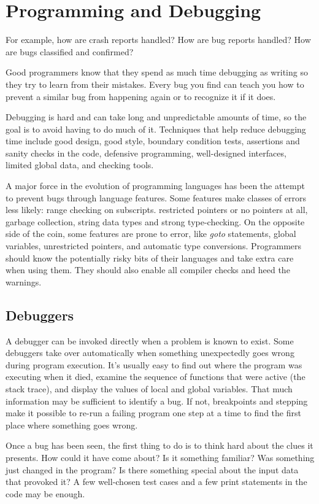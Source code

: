 \documentclass[draftclsnofoot,journal,onecolumn,12pt]{IEEEtran}
\begin{document}
\section{Programming and Debugging}

For example, how are crash reports handled? How are bug reports handled? How are bugs classified and confirmed?

Good programmers know that they spend as much time debugging as writing so they try to learn from their mistakes. Every bug you find can teach you how to prevent a similar bug from happening again or to recognize it if it does.

Debugging is hard and can take long and unpredictable amounts of time, so the goal is to avoid having to do much of it. Techniques that help reduce debugging time include good design, good style, boundary condition tests, assertions and sanity checks in the code, defensive programming, well-designed interfaces, limited global data, and checking tools.

A major force in the evolution of programming languages has been the attempt to prevent bugs through language features. Some features make classes of errors less likely: range checking on subscripts. restricted pointers or no pointers at all, garbage collection, string data types and strong type-checking. On the opposite side of the coin, some features are prone to error, like \textit{goto} statements, global variables, unrestricted pointers, and automatic type conversions. Programmers should know the potentially risky bits of their languages and take extra care when using them. They should also enable all compiler checks and heed the warnings.

\subsection{Debuggers}
A debugger can be invoked directly when a problem is known to exist. Some debuggers take over automatically when something unexpectedly goes wrong during program execution. It's usually easy to find out where the program was executing when it died, examine the sequence of functions that were active (the stack trace), and display the values of local and global variables. That much information may be sufficient to identify a bug. If not, breakpoints and stepping make it possible to re-run a failing program one step at a time to find the first place where something goes wrong.\cite{kernighan1999practice}

Once a bug has been seen, the first thing to do is to think hard about the clues it presents. How could it have come about? Is it something familiar? Was something just changed in the program? Is there something special about the input data that provoked it? A few well-chosen test cases and a few print statements in the code may be enough.
\end{document}

